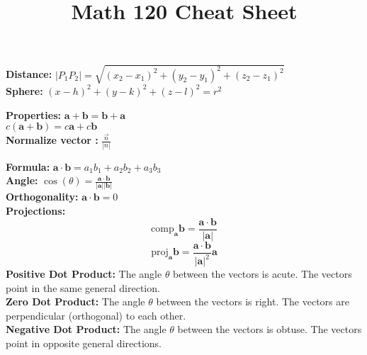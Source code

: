 \documentclass[2pt]{article}
\title{\small \textbf{Math 120 Cheat Sheet}} %
\date{} %
\begin{document}
\maketitle
\vspace{-10pt} %
\begin{multicols}{2}

\begin{tcolorbox}[title=\textbf{3D Coordinate Systems}, colframe=lightblue]
\textbf{Distance:} $|P_1P_2| = \sqrt{(x_2 - x_1)^2 + (y_2 - y_1)^2 + (z_2 - z_1)^2}$ \\
\textbf{Sphere:} $(x-h)^2 + (y-k)^2 + (z-l)^2 = r^2$
\end{tcolorbox}

\begin{tcolorbox}[title=\textbf{Vectors}, colframe=lightgreen]
\textbf{Properties:} $\mathbf{a} + \mathbf{b} = \mathbf{b} + \mathbf{a}$ \\
$c(\mathbf{a} + \mathbf{b}) = c\mathbf{a} + c\mathbf{b}$ \\
\textbf{Normalize vector :} $\frac{\vec{n}}{|n|} $ \\

\end{tcolorbox}

\begin{tcolorbox}[title=\textbf{Dot Product}, colframe=lightpink]
    \textbf{Formula:} $\mathbf{a} \cdot \mathbf{b} = a_1b_1 + a_2b_2 + a_3b_3$ \\
    \textbf{Angle:} $\cos(\theta) = \frac{\mathbf{a} \cdot \mathbf{b}}{|\mathbf{a}| |\mathbf{b}|}$ \\
    \textbf{Orthogonality:} $\mathbf{a} \cdot \mathbf{b} = 0$ \\
    \textbf{Projections:} 
    \[ \text{comp}_{\mathbf{a}} \mathbf{b} = \frac{\mathbf{a} \cdot \mathbf{b}}{|\mathbf{a}|} \] 
    \[ \text{proj}_{\mathbf{a}} \mathbf{b} = \frac{\mathbf{a} \cdot \mathbf{b}}{|\mathbf{a}|^2} \mathbf{a} \] 
    \textbf{Positive Dot Product:} The angle $\theta$ between the vectors is acute. The vectors point in the same general direction. \\ 
    \textbf{Zero Dot Product:} The angle $\theta$ between the vectors is right. The vectors are perpendicular (orthogonal) to each other. \\
    \textbf{Negative Dot Product:} The angle $\theta$ between the vectors is obtuse. The vectors point in opposite general directions. \\
\end{tcolorbox}


\end{multicols}
\end{document}
